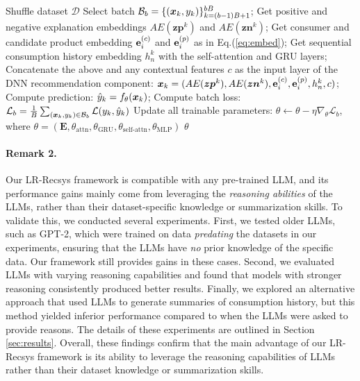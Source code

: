 \begin{algorithm}
\begin{algorithmic}[1]
        \STATE Shuffle dataset $\mathcal{D}$   
            \STATE Select batch $\mathcal{B}_b = \{({\bm{x}}_k, y_k)\}_{k=(b-1)B+1}^{bB}$;   
                \STATE Get positive and negative explanation embeddings $AE(\bm{zp}^k)$ and $AE(\bm{zn}^k)$;
                \STATE Get consumer and candidate product embedding $\mathbf{{\bm{e}}}^{(c)}_i$ and $\mathbf{{\bm{e}}}^{(p)}_i$ as in Eq.(\ref{eq:embed});
                \STATE Get sequential consumption history embedding $h_n^k$ with the self-attention and GRU layers; 
                \STATE Concatenate the above and any contextual features $c$ as the input layer of the DNN recommendation component: ${\bm{x}}_k = (AE(\bm{zp}^k), AE(\bm{zn}^k), \mathbf{{\bm{e}}}^{(c)}_i, \mathbf{{\bm{e}}}^{(p)}_i, h_n^k, c)$; 
                \STATE Compute prediction: $\hat{y}_k = f_\theta({\bm{x}}_k)$;
            \ENDFOR
            \STATE Compute batch loss: $\mathcal{L}_b = \frac{1}{B} \sum_{({\bm{x}}_k, y_k) \in \mathcal{B}_b} \mathcal{L}(y_k, \hat{y}_k)$
            \STATE Update all trainable parameters: $\theta \leftarrow \theta - \eta \nabla_\theta \mathcal{L}_b$, where $\theta = (\mathbf{E}, \theta_{\text{attn}}, \theta_{\text{GRU}}, \theta_{\text{self-attn}}, \theta_{\text{MLP}})$
        \ENDFOR
    \ENDFOR    
   \RETURN $\theta$   
\end{algorithmic}
\end{algorithm}

\noindent \paragraph{\textbf{Remark 2.}} Our LR-Recsys framework is compatible with any pre-trained LLM, and its performance gains mainly come from leveraging the \emph{reasoning abilities} of the LLMs, rather than their dataset-specific knowledge or summarization skills. To validate this, we conducted several experiments. First, we tested older LLMs, such as GPT-2, which were trained on data \emph{predating} the datasets in our experiments, ensuring that the LLMs have \emph{no} prior knowledge of the specific data. Our framework still provides gains in these cases. Second, we evaluated LLMs with varying reasoning capabilities and found that models with stronger reasoning consistently produced better results. Finally, we explored an alternative approach that used LLMs to generate summaries of consumption history, but this method yielded inferior performance compared to when the LLMs were asked to provide reasons. The details of these experiments are outlined in Section \ref{sec:results}. Overall, these findings confirm that the main advantage of our LR-Recsys framework is its ability to leverage the reasoning capabilities of LLMs rather than their dataset knowledge or summarization skills.


